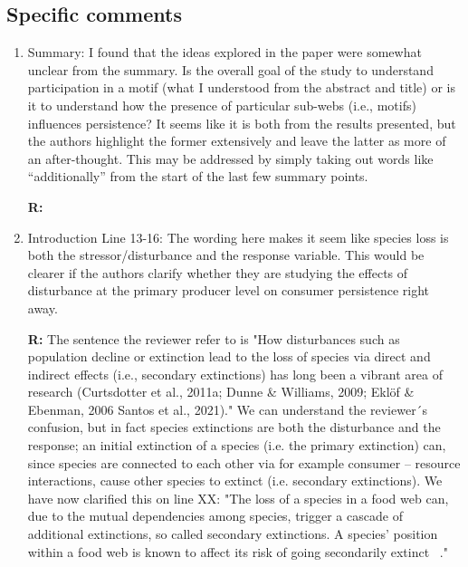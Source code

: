 \documentclass[12pt]{article}
\begin{document}
    \subsection*{Specific comments}

        \begin{enumerate}

            \item Summary: I found that the ideas explored in the paper were somewhat unclear from the summary. Is the overall goal of the study to understand participation in a motif (what I understood from the abstract and title) or is it to understand how the presence of particular sub-webs (i.e., motifs) influences persistence? It seems like it is both from the results presented, but the authors highlight the former extensively and leave the latter as more of an after-thought. This may be addressed by simply taking out words like “additionally” from the start of the last few summary points.

                \textbf{R:}

    
            \item Introduction Line 13-16: The wording here makes it seem like species loss is both the stressor/disturbance and the response variable. This would be clearer if the authors clarify whether they are studying the effects of disturbance at the primary producer level on consumer persistence right away. 

                \textbf{R:}
            The sentence the reviewer refer to is "How disturbances such as population decline or extinction lead to the loss of species via  direct and indirect effects (i.e., secondary extinctions) has long been a vibrant area of research (Curtsdotter et al., 2011a; Dunne & Williams, 2009; Eklöf \& Ebenman, 2006 Santos et al., 2021)." We can understand the reviewer´s confusion, but in fact species extinctions are both the disturbance and the response; an initial extinction of a species (i.e. the primary extinction) can, since species are connected to each other via for example consumer -- resource interactions, cause other species to extinct (i.e. secondary extinctions). We have now clarified this on line XX: 
            "The loss of a species in a food web can, due to the mutual dependencies among species, trigger a cascade of additional extinctions, so called secondary extinctions. A species' position within a food web is known to affect its risk of going secondarily extinct ~\citep{Santos2021,curtsdotter2011robustness, dunne2009cascading, Eklof2006}."
            

\end{enumerate}
\end{document}
